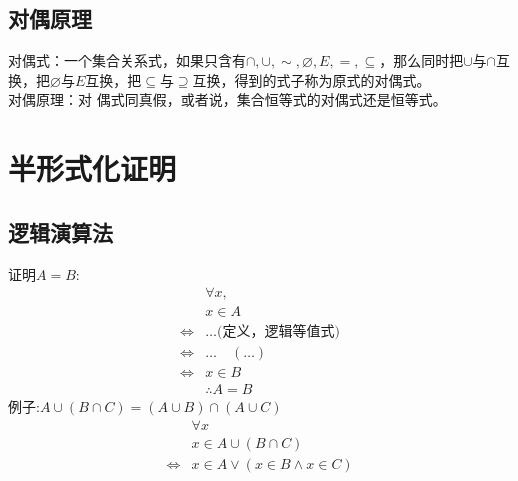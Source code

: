 \documentclass{book}
\newcommand{\Eqv}{\Leftrightarrow}
\newcommand{\A}{\forall}
\newcommand{\no}{\varnothing}
\begin{document}
\subsection{对偶原理}
\noindent
对偶式：一个集合关系式，如果只含有$\cap,\cup,\sim,\no,E,=,\subseteq$，那么同时把$\cup$与$\cap$互换，把$\no$与$E$互换，把$\subseteq$与$\supseteq$互换，得到的式子称为原式的对偶式。\\
对偶原理：对 偶式同真假，或者说，集合恒等式的对偶式还是恒等式。
\section{半形式化证明} 
\subsection{逻辑演算法} 
证明$A=B$:
\begin{align*}
    &\A x,\\
    &x\in A\\
    \Eqv&\dots \mbox{(定义，逻辑等值式)}\\
    \Eqv&\dots\quad (\dots)\\
    \Eqv&x\in B\\
    &\therefore A=B
\end{align*}  
例子:$A\cup (B\cap C)=(A\cup B)\cap (A\cup C)$
\begin{align*} 
&\A x\\
&x\in A\cup (B\cap C)\\
\Eqv&x\in A\lor (x\in B\land x\in C)\\

\end{align*}
\ifx\allfiles\undefined
\end{document}

